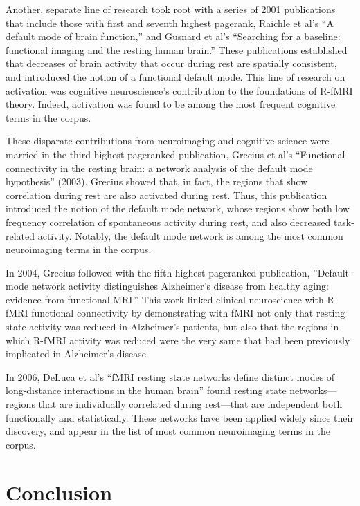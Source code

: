 \documentclass[12pt,5p]{elsarticle}
\begin{document}
Another, separate line of research took root with a series of 2001
publications that include those with first and seventh highest pagerank,
Raichle et al’s ``A default mode of brain function,'' and Gusnard et al’s
``Searching for a baseline: functional imaging and the resting human
brain.'' These publications established that decreases of brain activity
that occur during rest are spatially consistent, and introduced the notion
of a functional default mode. This line of research on activation was
cognitive neuroscience’s contribution to the foundations of R-fMRI theory.
Indeed, activation was found to be among the most frequent cognitive terms
in the corpus.

These disparate contributions from neuroimaging and cognitive science were
married in the third highest pageranked publication, Grecius et al’s
``Functional connectivity in the resting brain: a network analysis of the
default mode hypothesis'' (2003). Grecius showed that, in fact, the
regions that show correlation during rest are also activated during rest.
Thus, this publication introduced the notion of the default mode network,
whose regions show both low frequency correlation of spontaneous activity
during rest, and also decreased task-related activity. Notably, the
default mode network is among the most common neuroimaging terms in the
corpus.

In 2004, Grecius followed with the fifth highest pageranked publication,
''Default-mode network activity distinguishes Alzheimer’s disease from
healthy aging: evidence from functional MRI.'' This work linked clinical
neuroscience with R-fMRI functional connectivity by demonstrating with
fMRI not only that resting state activity was reduced in Alzheimer’s
patients, but also that the regions in which R-fMRI activity was reduced
were the very same that had been previously implicated in Alzheimer’s
disease. 

In 2006, DeLuca et al’s ``fMRI resting state networks define distinct
modes of long-distance interactions in the human brain'' found resting
state networks—regions that are individually correlated during rest—that
are independent both functionally and statistically. These networks have
been applied widely since their discovery, and appear in the list of most
common neuroimaging terms in the corpus.

\section{Conclusion}
\end{document}
